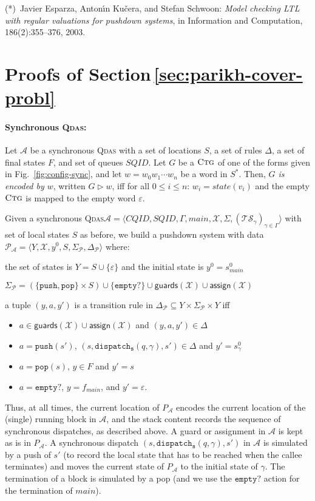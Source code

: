 \documentclass[runningheads,oribibl,]{article}
\newcommand{\tuple}[1]{\langle#1\rangle\xspace}
\newcommand{\Aa}{\ensuremath{\mathcal{A}}\xspace}
\newcommand{\Pp}{\ensuremath{\mathcal{P}}\xspace}
\newcommand{\Ts}{\ensuremath{\mathcal{TS}}\xspace}
\newcommand{\Xx}{\ensuremath{\mathcal{X}}\xspace}
\newcommand{\e}{\ensuremath{\varepsilon}\xspace}
\newcommand{\cfont}[1]{\ensuremath{\mathtt{#1}}\xspace}
\newcommand{\main}{\ensuremath{\textit{main}}\xspace}
\newcommand{\CQID}{CQID\xspace}
\newcommand{\SQID}{SQID\xspace}
\newcommand{\qdas}{\textsc{Qdas}\xspace}
\newcommand{\Graph}{\ensuremath{G}}
\newcommand{\state}{\ensuremath{\textit{state}}}
\newcommand{\ctg}{\ensuremath{\textsc{Ctg}}\xspace}
\newcommand{\disps}{\ensuremath{\cfont{dispatch_s}}}
\newcommand{\guardson}[1]{\ensuremath{\mathsf{guards}\left(#1\right)}}
\newcommand{\assignon}[1]{\ensuremath{\mathsf{assign}\left(#1\right)}}
\newcommand{\push}{\ensuremath{\cfont{push}}}
\newcommand{\pop}{\ensuremath{\cfont{pop}}}
\newcommand{\emptystack}{\ensuremath{\cfont{empty?}}}
\newenvironment{myitemize}{\begin{list}{\labelitemi}{\setlength{\topsep}{4pt}\setlength{\partopsep}{0pt}
\setlength{\itemsep}{0pt}
\setlength{\itemindent}{0ex}
\setlength{\listparindent}{0ex}
\setlength{\leftmargin}{4ex}\setlength{\labelwidth}{2ex}
}}
{\end{list}}
\begin{document}
{\small
(*)~Javier Esparza, Anton\'{\i}n Ku\v{c}era, and Stefan Schwoon:
\textsl{Model checking  LTL with regular valuations for pushdown systems},
in { Information and Computation}, 186(2):355--376, 2003.
}


\section{Proofs of Section\,\ref{sec:parikh-cover-probl}}

\paragraph{\bf Synchronous \qdas:}


Let $\Aa$ be a synchronous \qdas with a set of locations $S$,
a set of rules $\Delta$, a set of final states $F$, and
set of queues $\SQID$. Let $\Graph$ be a \ctg of one of the forms given
in Fig.~\ref{fig:config-sync}, and let $w=w_0w_1\cdots w_n$ be a word
in $S^*$. Then, \emph{$\Graph$ is encoded by $w$},
written $\Graph\triangleright w$, iff for all $0\leq i\leq n$:
$w_i=\state(v_i)$ and the empty \ctg is mapped to the empty word $\e$.

Given a synchronous \qdas $\Aa=\tuple{ \CQID, \SQID, \Gamma, main,
  \Xx, \Sigma, (\Ts_\gamma)_{\gamma\in\Gamma}}$ with set of local
states $S$ as before, we build a pushdown system with data
$\Pp_\Aa=\tuple{Y,\Xx,y^0,S,\Sigma_\Pp,\Delta_\Pp}$ where:
\begin{myitemize}
\item the set of states is $Y=S\cup\{\e\}$ and the initial state is
  $y^0=s^0_{\main}$
\item $\Sigma_\Pp =\left(\{\push,\pop\}\times S \right) \cup
  \{\emptystack\} \cup \guardson{\Xx}\cup\assignon{\Xx}$
\item a tuple $(y,a,y')$ is a transition rule in $\Delta_\Pp\subseteq
  Y\times \Sigma_\Pp \times Y$ iff
  \begin{itemize}
    \renewcommand{\labelitemi}{\bf$\sim$}
  \item $a\in\guardson{\Xx}\cup\assignon{\Xx}$ and
    $(y,a,y')\in\Delta$
  \item $a=\push(s')$, $(s,\disps(q,\gamma),s')\in\Delta$ and
    $y'=s^0_\gamma$
  \item $a=\pop(s)$, $y\in F$ and $y'=s$
  \item $a=\emptystack$, $y=f_{main}$, and $y'=\e$.
  \end{itemize}
\end{myitemize}
Thus, at all times, the current location of $P_\Aa$ encodes the
current location of the (single) running block in $\Aa$, and the stack
content records the sequence of synchronous dispatches, as described
above. A guard or assignment in $\Aa$ is kept as is in $P_\Aa$. A
synchronous dispatch $(s,\disps(q,\gamma),s')$ in $\Aa$ is simulated
by a push of $s'$ (to record the local state that has to be reached
when the callee terminates) and moves the current state of $P_\Aa$ to
the initial state of $\gamma$. The termination of a block is simulated
by a pop (and we use the $\emptystack$ action for the termination of
$main$).
\end{document}
